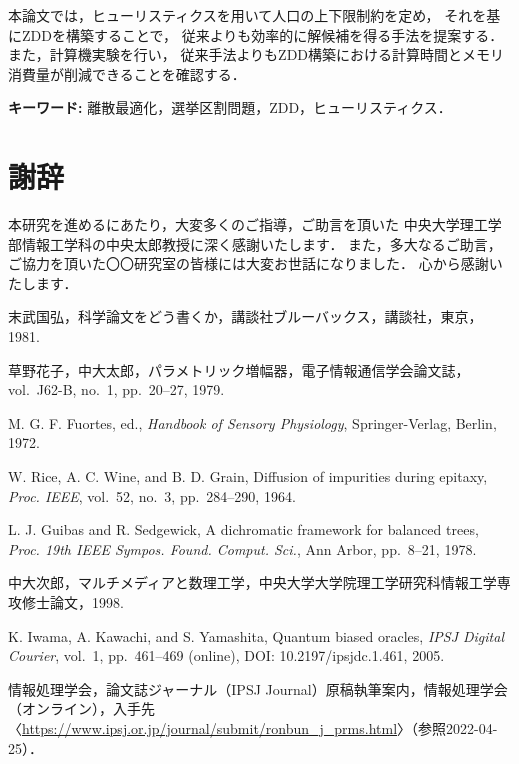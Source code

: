 ﻿\documentclass[a4j,12pt]{jreport}
\def\syaji{ \chapter*{謝辞} \addcontentsline{toc}{chapter}{謝辞}}
\begin{document}
本論文では，ヒューリスティクスを用いて人口の上下限制約を定め，
それを基にZDDを構築することで，
従来よりも効率的に解候補を得る手法を提案する．
また，計算機実験を行い，
従来手法よりもZDD構築における計算時間とメモリ消費量が削減できることを確認する．


\vspace{1zw} \noindent
{\bf キーワード: }離散最適化，選挙区割問題，ZDD，ヒューリスティクス．

\tableofcontents


\newpage
{}









\syaji
\par
本研究を進めるにあたり，大変多くのご指導，ご助言を頂いた
中央大学理工学部情報工学科の中央太郎教授に深く感謝いたします．
また，多大なるご助言，ご協力を頂いた〇〇研究室の皆様には大変お世話になりました．
心から感謝いたします．


\begin{thebibliography}{99}


末武国弘，科学論文をどう書くか，講談社ブルーバックス，講談社，東京，1981. 

草野花子，中大太郎，パラメトリック増幅器，電子情報通信学会論文誌，vol.~J62-B, no.~1, pp.~20--27, 1979. 

M. G. F. Fuortes, ed., \textit{Handbook of Sensory Physiology}, Springer-Verlag, Berlin, 1972.

W. Rice, A. C. Wine, and B. D. Grain, Diffusion of impurities during epitaxy, \textit{Proc. IEEE}, vol.~52, no.~3, pp.~284--290, 1964.

L. J. Guibas and R. Sedgewick, A dichromatic framework for balanced trees, 
\textit{Proc. 19th IEEE Sympos. Found. Comput. Sci.}, Ann Arbor, pp.~8--21, 1978.

中大次郎，マルチメディアと数理工学，中央大学大学院理工学研究科情報工学専攻修士論文，1998.

K. Iwama, A. Kawachi, and S. Yamashita, Quantum biased oracles, \textit{IPSJ Digital Courier}, vol.~1, pp.~461--469 (online), DOI: 10.2197/ipsjdc.1.461, 2005.

情報処理学会，論文誌ジャーナル（IPSJ Journal）原稿執筆案内，情報処理学会（オンライン），入手先〈\url{https://www.ipsj.or.jp/journal/submit/ronbun_j_prms.html}〉（参照2022-04-25）．


\end{thebibliography}

\end{document}
